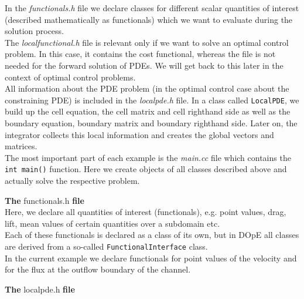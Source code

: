In the \textit{functionals.h} file we declare classes for different scalar quantities of interest (described mathematically as functionals) which we want to evaluate during the solution process.\\

The \textit{localfunctional.h} file is relevant only if we want to solve an optimal control problem. In this case, it contains the cost functional, whereas the file is not needed for the forward solution of PDEs. We will get back to this later in the context of optimal control problems.\\

All information about the PDE problem (in the optimal control case about the constraining PDE) is included in the \textit{localpde.h} file. In a class called \texttt{LocalPDE}, we build up the cell equation, the cell matrix and cell righthand side as well as the boundary equation, boundary matrix and boundary righthand side. Later on, the integrator collects this local information and creates the global vectors and matrices.\\

The most important part of each example is the \textit{main.cc} file which contains the \texttt{int main()} function. Here we create objects of all classes described above and actually solve the respective problem.\\
 
\vspace{0.2cm}

\textbf{The} functionals.h \textbf{file}\\

\vspace{0.2cm}
Here, we declare all quantities of interest (functionals), e.g. point values, drag, lift, mean values of certain quantities over a subdomain etc. \\
Each of these functionals is declared as a class of its own, but in DOpE all classes are derived from a so-called \texttt{FunctionalInterface} class.\\
In the current example we declare functionals for point values of the velocity and for the flux at the outflow boundary of the channel. \\

\vspace{0.2cm}

\textbf{The} localpde.h \textbf{file}\\

